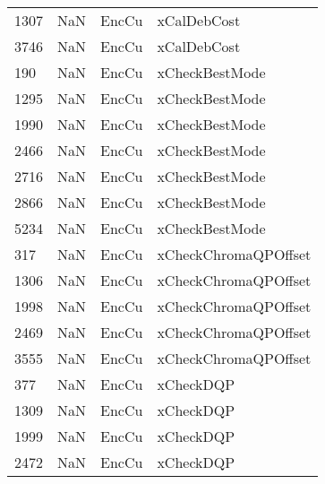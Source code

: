 \begin{tabular}{llll}
1307 &                   NaN &                      EncCu &                               xCalDebCost \\
3746 &                   NaN &                      EncCu &                               xCalDebCost \\
190  &                   NaN &                      EncCu &                            xCheckBestMode \\
1295 &                   NaN &                      EncCu &                            xCheckBestMode \\
1990 &                   NaN &                      EncCu &                            xCheckBestMode \\
2466 &                   NaN &                      EncCu &                            xCheckBestMode \\
2716 &                   NaN &                      EncCu &                            xCheckBestMode \\
2866 &                   NaN &                      EncCu &                            xCheckBestMode \\
5234 &                   NaN &                      EncCu &                            xCheckBestMode \\
317  &                   NaN &                      EncCu &                      xCheckChromaQPOffset \\
1306 &                   NaN &                      EncCu &                      xCheckChromaQPOffset \\
1998 &                   NaN &                      EncCu &                      xCheckChromaQPOffset \\
2469 &                   NaN &                      EncCu &                      xCheckChromaQPOffset \\
3555 &                   NaN &                      EncCu &                      xCheckChromaQPOffset \\
377  &                   NaN &                      EncCu &                                 xCheckDQP \\
1309 &                   NaN &                      EncCu &                                 xCheckDQP \\
1999 &                   NaN &                      EncCu &                                 xCheckDQP \\
2472 &                   NaN &                      EncCu &                                 xCheckDQP \\

\end{tabular}
